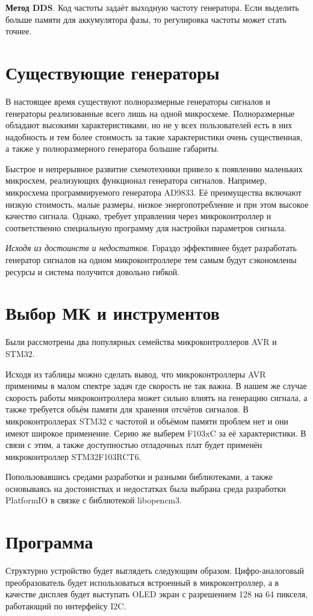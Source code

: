 \documentclass[a4paper, 14pt]{extarticle}
\begin{document}
\textbf{Метод DDS}. Код частоты задаёт выходную частоту генератора. Если выделить больше памяти для аккумулятора фазы, то регулировка частоты может стать точнее.

\section*{Существующие генераторы}	
	В настоящее время существуют полноразмерные генераторы сигналов и генераторы реализованные всего лишь на одной микросхеме. Полноразмерные обладают высокими характеристиками, но не у всех пользователей есть в них надобность и тем более стоимость за такие характеристики очень существенная, а также у полноразмерного генератора большие габариты.
	
	Быстрое и непрерывное развитие схемотехники привело к появлению маленьких микросхем, реализующих функционал генератора сигналов. Например, микросхема программируемого генератора AD9833. Её преимущества включают низкую стоимость, малые размеры, низкое энергопотребление и при этом высокое качество сигнала. Однако, требует управления через микроконтроллер и соответственно специальную программу для настройки параметров сигнала.

	\textit{Исходя из достоинств и недостатков}. Гораздо эффективнее будет разработать генератор сигналов на одном микроконтроллере тем самым будут сэкономлены ресурсы и система получится довольно гибкой.
\section*{Выбор МК и инструментов}
	Были рассмотрены два популярных семейства микроконтроллеров AVR и STM32.
	
	Исходя из таблицы можно сделать вывод, что микроконтроллеры AVR применимы в малом спектре задач где скорость не так важна. В нашем же случае скорость работы микроконтроллера может сильно влиять на генерацию сигнала, а также требуется объём памяти для хранения отсчётов сигналов. В микроконтроллерах STM32 с частотой и объёмом памяти проблем нет и они имеют широкое применение. Серию же выберем F103xC за её характеристики. В связи с этим, а также доступностью отладочных плат будет применён микроконтроллер STM32F103RCT6.
	
	Попользовавшись средами разработки и разными библиотеками, а также основываясь на достоинствах и недостатках была выбрана среда разработки PlatformIO в связке с библиотекой libopencm3.
	
\section*{Программа}
	Структурно устройство будет выглядеть следующим образом. Цифро-аналоговый преобразователь будет использоваться встроенный в микроконтроллер, а в качестве дисплея будет выступать OLED экран с разрешением 128 на 64 пикселя, работающий по интерфейсу I2C.
\end{document}
